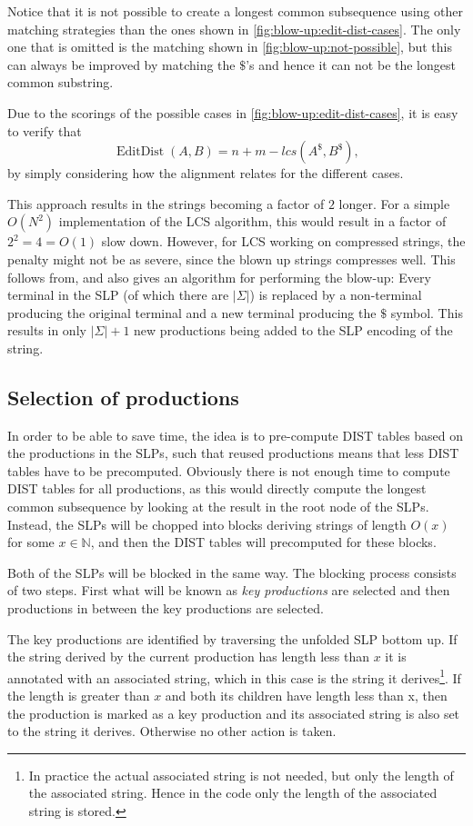 \documentclass[twoside,11pt,openright]{report}
\newcommand{\EditDist}{\operatorname{EditDist}}
\begin{document}
%
Notice that it is not possible to create a longest common subsequence using other matching strategies than the ones shown in \cref{fig:blow-up:edit-dist-cases}. The only one that is omitted is the matching shown in \cref{fig:blow-up:not-possible}, but this can always be improved by matching the $\$$'s and hence it can not be the longest common substring.

Due to the scorings of the possible cases in \cref{fig:blow-up:edit-dist-cases}, it is easy to verify that
\[
  \EditDist(A, B) = n + m - lcs(A^{\$}, B^{\$}),
\]
by simply considering how the alignment relates for the different cases.

This approach results in the strings becoming a factor of $2$ longer. For a simple $O(N^2)$ implementation of the LCS algorithm, this would result in a factor of $2^2 = 4 = O(1)$ slow down. However, for LCS working on compressed strings, the penalty might not be as severe, since the blown up strings compresses well. This follows from, and also gives an algorithm for performing the blow-up: Every terminal in the SLP (of which there are $|\Sigma|$) is replaced by a non-terminal producing the original terminal and a new terminal producing the $\$$ symbol. This results in only $|\Sigma| + 1$ new productions being added to the SLP encoding of the string.

\subsection{Selection of productions}
\label{sec:algorithm:select-productions}
In order to be able to save time, the idea is to pre-compute DIST tables based on the productions in the SLPs, such that reused productions means that less DIST tables have to be precomputed. Obviously there is not enough time to compute DIST tables for all productions, as this would directly compute the longest common subsequence by looking at the result in the root node of the SLPs. Instead, the SLPs will be chopped into blocks deriving strings of length $O(x)$ for some $x \in \mathbb{N}$, and then the DIST tables will precomputed for these blocks.

Both of the SLPs will be blocked in the same way. The blocking process consists of two steps. First what will be known as \textit{key productions} are selected and then productions in between the key productions are selected.

The key productions are identified by traversing the unfolded SLP bottom up. If the string derived by the current production has length less than $x$ it is annotated with an associated string, which in this case is the string it derives\footnote{In practice the actual associated string is not needed, but only the length of the associated string. Hence in the code only the length of the associated string is stored.}. If the length is greater than $x$ and both its children have length less than x, then the production is marked as a key production and its associated string is also set to the string it derives. Otherwise no other action is taken.
\end{document}
